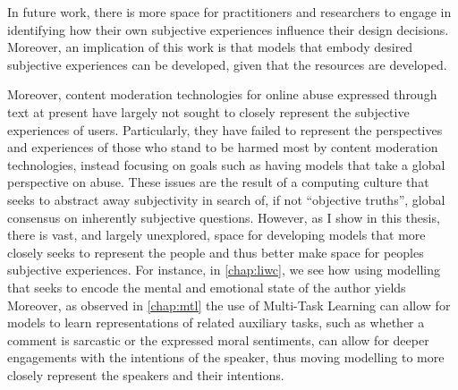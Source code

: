 In future work, there is more space for practitioners and researchers to engage in identifying how their own subjective experiences influence their design decisions.
Moreover, an implication of this work is that models that embody desired subjective experiences can be developed, given that the resources  are developed.

Moreover, content moderation technologies for online abuse expressed through text at present have largely not sought to closely represent the subjective experiences of users.
Particularly, they have failed to represent the perspectives and experiences of those who stand to be harmed most by content moderation technologies, instead focusing on goals such as having models that take a global perspective on abuse.
These issues are the result of a computing culture that seeks to abstract away subjectivity in search of, if not ``objective truths'', global consensus on inherently subjective questions.
However, as I show in this thesis, there is vast, and largely unexplored, space for developing models that more closely seeks to represent the people and thus better make space for peoples subjective experiences.
For instance, in \cref{chap:liwc}, we see how using modelling that seeks to encode the mental and emotional state of the author yields 
Moreover, as observed in \cref{chap:mtl} the use of Multi-Task Learning can allow for models to learn representations of related auxiliary tasks, such as whether a comment is sarcastic or the expressed moral sentiments, can allow for deeper engagements with the intentions of the speaker, thus moving modelling to more closely represent the speakers and their intentions.


